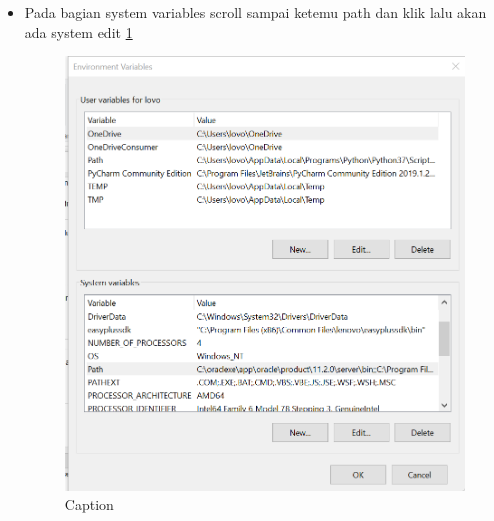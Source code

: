 \begin{enumerate}
\begin{itemize}
        \item Pada bagian system variables scroll sampai ketemu path dan klik lalu akan ada system edit \ref{capture7}
         \begin{figure} [h]
            \centering
            \includegraphics[scale=0.3]{figures/Capture7.PNG}
            \caption{Caption}
            \label{capture7}
        \end{figure}
        

\end{itemize}
\end{enumerate}
